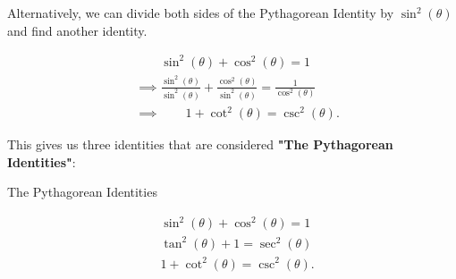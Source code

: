 Alternatively, we can divide both sides of the Pythagorean Identity by $\sin^{2}
(\theta)$ and find another identity.

\begin{align*}
  &\qquad\sin^{2} (\theta) + \cos^{2} (\theta) = 1 \\
  &\implies \frac{\sin^{2} (\theta)}{\sin^{2} (\theta)} + \frac{\cos^{2} (\theta)}{\sin^{2} (\theta)} = \frac{1}{\cos^{2} (\theta)} \\
  &\implies \qquad 1 + \cot^{2} (\theta) = \csc^{2} (\theta)
.\end{align*}

This gives us three identities that are considered \textbf{"The Pythagorean
Identities"}:

\begin{tcolorbox}
  \begin{center}
    The Pythagorean Identities
  \end{center}
  \begin{align*}
    &\sin^{2} (\theta) + \cos^{2} (\theta) = 1 \\
    &\tan^{2} (\theta) + 1 = \sec^{2} (\theta) \\
    &1 + \cot^{2} (\theta) = \csc^{2} (\theta)
  .\end{align*}
\end{tcolorbox}

\newpage
